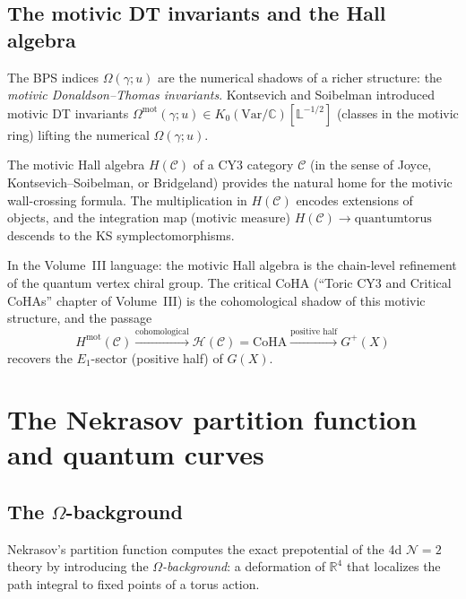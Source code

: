 \documentclass[11pt]{article}
\theoremstyle{definition}
\theoremstyle{remark}
\newcommand{\cC}{\mathcal{C}}
\newcommand{\cN}{\mathcal{N}}
\begin{document}
\subsection{The motivic DT invariants and the Hall algebra}
\label{subsec:motivic-dt}

The BPS indices $\Omega(\gamma; u)$ are the numerical shadows of a richer structure: the
\emph{motivic Donaldson--Thomas invariants}. Kontsevich and Soibelman introduced motivic DT
invariants $\Omega^{\mathrm{mot}}(\gamma; u) \in K_0(\mathrm{Var}/\mathbb{C})[\mathbb{L}^{-1/2}]$
(classes in the motivic ring) lifting the numerical $\Omega(\gamma; u)$.

The motivic Hall algebra $H(\cC)$ of a CY3 category $\cC$ (in the sense of Joyce, Kontsevich--Soibelman,
or Bridgeland) provides the natural home for the motivic wall-crossing formula. The multiplication
in $H(\cC)$ encodes extensions of objects, and the integration map (motivic measure)
$H(\cC) \to \mathrm{quantum torus}$ descends to the KS symplectomorphisms.

In the Volume~III language: the motivic Hall algebra is the chain-level refinement of the quantum
vertex chiral group. The critical CoHA (``Toric CY3 and Critical CoHAs'' chapter of Volume~III) is the
cohomological shadow of this motivic structure, and the passage
\begin{equation}
 \label{eq:coha-chain}
 H^{\mathrm{mot}}(\cC) \xrightarrow{\text{cohomological}} \mathcal{H}(\cC) = \mathrm{CoHA} \xrightarrow{\text{positive half}} G^+(X)
\end{equation}
recovers the $E_1$-sector (positive half) of $G(X)$.


\section{The Nekrasov partition function and quantum curves}
\label{sec:nekrasov}

\subsection{The $\Omega$-background}
\label{subsec:omega-background}

Nekrasov's partition function computes the exact prepotential of the 4d $\cN=2$ theory by
introducing the \emph{$\Omega$-background}: a deformation of $\mathbb{R}^4$ that localizes the
path integral to fixed points of a torus action.
\end{document}
